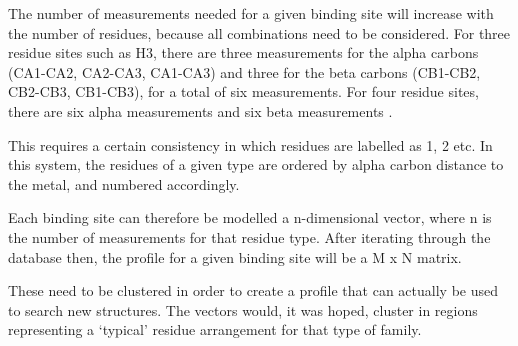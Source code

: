 The number of measurements needed for a given binding site will increase with the number of residues, because all combinations need to be considered. For three residue sites such as H3, there are three measurements for the alpha carbons (CA1-CA2, CA2-CA3, CA1-CA3) and three for the beta carbons (CB1-CB2, CB2-CB3, CB1-CB3), for a total of six measurements. For four residue sites, there are six alpha measurements and six beta measurements .

This requires a certain consistency in which residues are labelled as 1, 2 etc. In this system, the residues of a given type are ordered by alpha carbon distance to the metal, and numbered accordingly.

Each binding site can therefore be modelled a n-dimensional vector, where n is the number of measurements for that residue type. After iterating through the database then, the profile for a given binding site will be a M x N matrix.

These need to be clustered in order to create a profile that can actually be used to search new structures. The vectors would, it was hoped, cluster in regions representing a `typical' residue arrangement for that type of family.